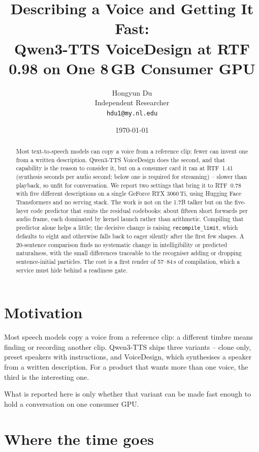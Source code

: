 \documentclass[11pt]{article}
\title{Describing a Voice and Getting It Fast:\\
Qwen3-TTS VoiceDesign at RTF 0.98 on One 8\,GB Consumer GPU}
\author{Hongyun Du\\Independent Researcher\\\texttt{hdu1@my.nl.edu}}
\date{\today}
\begin{document}
\maketitle

\begin{abstract}
Most text-to-speech models can copy a voice from a reference clip; fewer can invent one from a written description.
Qwen3-TTS VoiceDesign does the second, and that capability is the reason to consider it, but on a consumer card it
ran at RTF~1.41 (synthesis seconds per audio second; below one is required for streaming) -- slower than
playback, so unfit for conversation. We report two settings that bring it to
RTF~0.78 with five different descriptions on a single GeForce RTX 3060\,Ti, using Hugging Face Transformers and no
serving stack. The work is not on the 1.7B talker but on the five-layer code predictor that emits the residual
codebooks: about fifteen short forwards per audio frame, each dominated by kernel launch rather than arithmetic.
Compiling that predictor alone helps a little; the decisive change is raising \texttt{recompile\_limit}, which
defaults to eight and otherwise falls back to eager silently after the first few shapes. A 20-sentence comparison
finds no systematic change in intelligibility or predicted naturalness, with the small differences traceable to the
recogniser adding or dropping sentence-initial particles. The cost is a first render of 57--84\,s of compilation,
which a service must hide behind a readiness gate.
\end{abstract}

\section{Motivation}

Most speech models copy a voice from a reference clip: a different timbre means finding or recording another clip.
Qwen3-TTS ships three variants -- clone only, preset speakers with instructions, and VoiceDesign, which synthesises a
speaker from a written description. For a product that wants more than one voice, the third is the interesting one.

What is reported here is only whether that variant can be made fast enough to hold a conversation on one consumer
GPU.

\section{Where the time goes}
\end{document}
